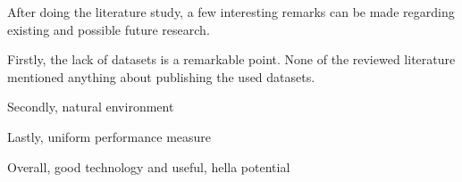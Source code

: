 After doing the literature study, a few interesting remarks can be made regarding existing and possible future research. 

Firstly, the lack of datasets is a remarkable point. None of the reviewed literature mentioned anything about publishing the used datasets. 

Secondly, natural environment

Lastly, uniform performance measure

Overall, good technology and useful, hella potential